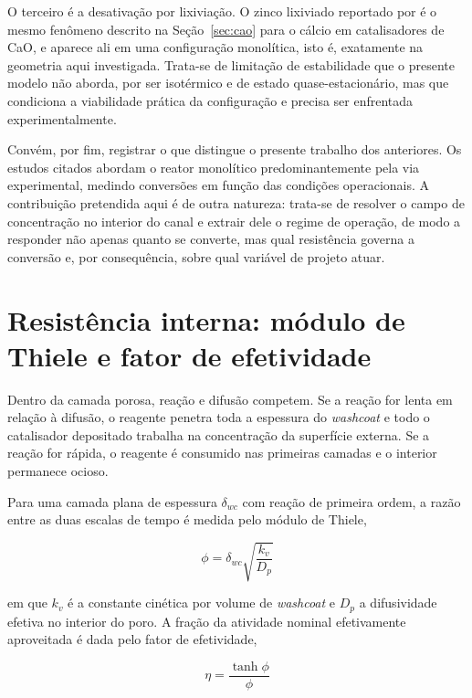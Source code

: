 O terceiro é a desativação por lixiviação. O zinco lixiviado reportado por
\textcite{Asli2011} é o mesmo fenômeno descrito na Seção~\ref{sec:cao} para o
cálcio em catalisadores de CaO, e aparece ali em uma configuração monolítica,
isto é, exatamente na geometria aqui investigada. Trata-se de limitação de
estabilidade que o presente modelo não aborda, por ser isotérmico e de estado
quase-estacionário, mas que condiciona a viabilidade prática da configuração e
precisa ser enfrentada experimentalmente.

Convém, por fim, registrar o que distingue o presente trabalho dos anteriores.
Os estudos citados abordam o reator monolítico predominantemente pela via
experimental, medindo conversões em função das condições operacionais. A
contribuição pretendida aqui é de outra natureza: trata-se de resolver o campo
de concentração no interior do canal e extrair dele o regime de operação, de
modo a responder não apenas quanto se converte, mas qual resistência governa a
conversão e, por consequência, sobre qual variável de projeto atuar.

\section{Resistência interna: módulo de Thiele e fator de efetividade}
\label{sec:thiele}

Dentro da camada porosa, reação e difusão competem. Se a reação for lenta em
relação à difusão, o reagente penetra toda a espessura do \textit{washcoat} e
todo o catalisador depositado trabalha na concentração da superfície externa. Se
a reação for rápida, o reagente é consumido nas primeiras camadas e o interior
permanece ocioso.

Para uma camada plana de espessura $\delta_{wc}$ com reação de primeira ordem, a
razão entre as duas escalas de tempo é medida pelo módulo de Thiele,

\begin{equation}
\phi = \delta_{wc}\sqrt{\frac{k_v}{D_p}}
\label{eq:thiele}
\end{equation}

\noindent
em que $k_v$ é a constante cinética por volume de \textit{washcoat} e $D_p$ a
difusividade efetiva no interior do poro. A fração da atividade nominal
efetivamente aproveitada é dada pelo fator de efetividade,

\begin{equation}
\eta = \frac{\tanh \phi}{\phi}
\label{eq:efetividade}
\end{equation}

